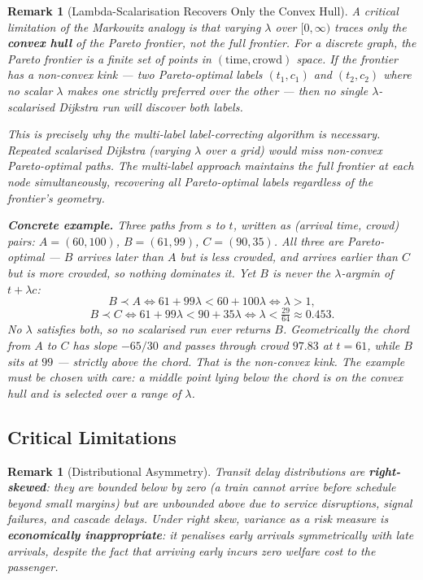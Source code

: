 \documentclass[11pt, a4paper]{article}
\newtheorem{remark}[theorem]{Remark}
\theoremstyle{remark}
\begin{document}
\begin{remark}[Lambda-Scalarisation Recovers Only the Convex Hull]
    \label{rem:convex-hull}
    A critical limitation of the Markowitz analogy is that varying $\lambda$
    over $[0, \infty)$ traces only the \textbf{convex hull} of the Pareto
    frontier, not the full frontier. For a discrete graph, the Pareto frontier
    is a finite set of points in $(\text{time}, \text{crowd})$ space. If the
    frontier has a non-convex kink — two Pareto-optimal labels $(t_1, c_1)$
    and $(t_2, c_2)$ where no scalar $\lambda$ makes one strictly preferred
    over the other — then \emph{no single $\lambda$-scalarised Dijkstra run
    will discover both labels}.

    This is precisely why the multi-label label-correcting algorithm is
    necessary. Repeated scalarised Dijkstra (varying $\lambda$ over a grid)
    would miss non-convex Pareto-optimal paths. The multi-label approach
    maintains the full frontier at each node simultaneously, recovering all
    Pareto-optimal labels regardless of the frontier's geometry.

    \textbf{Concrete example.} Three paths from $s$ to $t$, written as
    (arrival time, crowd) pairs: $A = (60, 100)$, $B = (61, 99)$, $C = (90, 35)$.
    All three are Pareto-optimal --- $B$ arrives later than $A$ but is less
    crowded, and arrives earlier than $C$ but is more crowded, so nothing
    dominates it. Yet $B$ is never the $\lambda$-argmin of $t + \lambda c$:
    \[
        B \prec A \iff 61 + 99\lambda < 60 + 100\lambda \iff \lambda > 1,
    \]
    \[
        B \prec C \iff 61 + 99\lambda < 90 + 35\lambda \iff \lambda < \tfrac{29}{64} \approx 0.453 .
    \]
    No $\lambda$ satisfies both, so no scalarised run ever returns $B$.
    Geometrically the chord from $A$ to $C$ has slope $-65/30$ and passes through
    crowd $97.83$ at $t = 61$, while $B$ sits at $99$ --- strictly \emph{above} the
    chord. That is the non-convex kink. The example must be chosen with care: a
    middle point lying \emph{below} the chord is on the convex hull and \emph{is}
    selected over a range of $\lambda$.
\end{remark}

\subsection{Critical Limitations}

\begin{remark}[Distributional Asymmetry]
    Transit delay distributions are \textbf{right-skewed}: they are bounded
    below by zero (a train cannot arrive before schedule beyond small margins)
    but are unbounded above due to service disruptions, signal failures, and
    cascade delays. Under right skew, variance as a risk measure is
    \textbf{economically inappropriate}: it penalises early arrivals
    symmetrically with late arrivals, despite the fact that arriving early
    incurs zero welfare cost to the passenger.
\end{remark}
\end{document}
